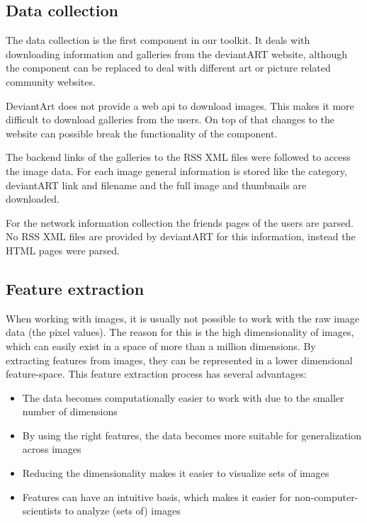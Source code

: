 \subsection{Data collection}

The data collection is the first component in our toolkit.
It deals with downloading information and galleries from the deviantART website,
although the component can be replaced to deal with different art or picture related community websites. 

DeviantArt does not provide a web api to download images. This makes it more 
difficult to download galleries from the users. 
On top of that changes to the website can possible break the functionality of the component.

The backend links of the galleries to the RSS XML files were followed to access
the image data. For each image general information is 
stored like the category, deviantART link and filename and the full image and 
thumbnails are downloaded.

For the network information collection the friends pages 
of the users are parsed. No RSS XML files are provided by deviantART for this
information, instead the HTML pages were parsed.

\subsection{Feature extraction}
When working with images, it is usually not possible to work with the raw image data (the pixel values). The reason for this is the high dimensionality of images, which can easily exist in a space of more than a million dimensions. By extracting features from images, they can be represented in a lower dimensional feature-space.  This feature extraction process has several advantages:
\begin{itemize}
\item The data becomes computationally easier to work with due to the smaller number of dimensions
\item By using the right features, the data becomes more suitable for generalization across images
\item Reducing the dimensionality makes it easier to visualize sets of images
\item Features can have an intuitive basis, which makes it easier for non-computer-scientists to analyze (sets of) images
\end{itemize}

